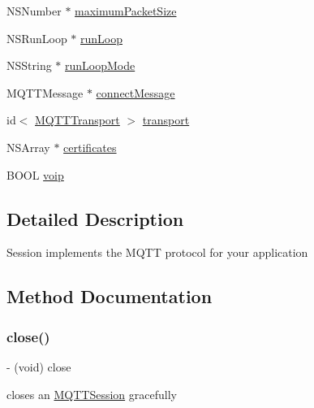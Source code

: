 \begin{DoxyCompactItemize}
N\+S\+Number $\ast$ \hyperlink{interface_m_q_t_t_session_a5f760a87b7c349e612e103f0147b516b}{maximum\+Packet\+Size}
\item 
N\+S\+Run\+Loop $\ast$ \hyperlink{interface_m_q_t_t_session_a49e106f38faead00b6d9d53a77a50472}{run\+Loop}
\item 
N\+S\+String $\ast$ \hyperlink{interface_m_q_t_t_session_a3ab2f0926aa51b0dc7969c66bae215e4}{run\+Loop\+Mode}
\item 
M\+Q\+T\+T\+Message $\ast$ \hyperlink{interface_m_q_t_t_session_a44f63ba3383e0e5c5bed5e051cad9d2f}{connect\+Message}
\item 
id$<$ \hyperlink{interface_m_q_t_t_transport}{M\+Q\+T\+T\+Transport} $>$ \hyperlink{interface_m_q_t_t_session_ab3839efa8f1e67c2a1270a0bfa7362c1}{transport}
\item 
N\+S\+Array $\ast$ \hyperlink{interface_m_q_t_t_session_a8093f2231e12c54af5eb1791cc60b06f}{certificates}
\item 
B\+O\+OL \hyperlink{interface_m_q_t_t_session_a289e2046978f865a280c61725df526c1}{voip}
\end{DoxyCompactItemize}


\subsection{Detailed Description}
Session implements the M\+Q\+TT protocol for your application 

\subsection{Method Documentation}
\mbox{\label{interface_m_q_t_t_session_a6e08af5a1b20daabe6be9b9a0618c440}} 
\subsubsection{\texorpdfstring{close()}{close()}}
{\footnotesize\ttfamily -\/ (void) close \begin{DoxyParamCaption}{ }\end{DoxyParamCaption}}

closes an \hyperlink{interface_m_q_t_t_session}{M\+Q\+T\+T\+Session} gracefully \mbox{\label{interface_m_q_t_t_session_a5a617d3cee077dd60f48a340d4b34d99}} 
